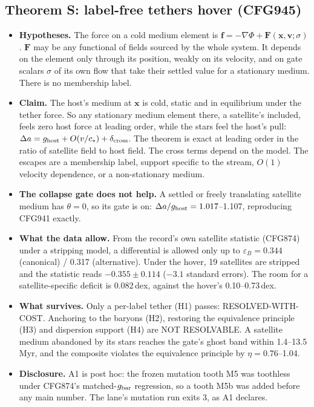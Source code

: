 \documentclass[10pt]{article}
\begin{document}
\subsection{Theorem S: label-free tethers hover (CFG945)}
\begin{itemize}
\item \textbf{Hypotheses.} The force on a cold medium element is $\mathbf f=-\nabla\Phi+\mathbf F(\mathbf x,\mathbf v;\sigma)$. $\mathbf F$ may be any functional of fields sourced by the whole system. It depends on the element only through its position, weakly on its velocity, and on gate scalars $\sigma$ of its own flow that take their settled value for a stationary medium. There is no membership label.
\item \textbf{Claim.} The host's medium at $\mathbf x$ is cold, static and in equilibrium under the tether force. So any stationary medium element there, a satellite's included, feels zero host force at leading order, while the stars feel the host's pull: $\Delta a=g_{\rm host}+O(v/c_*)+\delta_{\rm cross}$. The theorem is exact at leading order in the ratio of satellite field to host field. The cross terms depend on the model. The escapes are a membership label, support specific to the stream, $O(1)$ velocity dependence, or a non-stationary medium.
\item \textbf{The collapse gate does not help.} A settled or freely translating satellite medium has $\theta=0$, so its gate is on: $\Delta a/g_{\rm host}=1.017$--1.107, reproducing CFG941 exactly.
\item \textbf{What the data allow.} From the record's own satellite statistic (CFG874) under a stripping model, a differential is allowed only up to $\varepsilon_B=0.344$ (canonical) / 0.317 (alternative). Under the hover, 19 satellites are stripped and the statistic reads $-0.355\pm0.114$ ($-3.1$ standard errors). The room for a satellite-specific deficit is 0.082\,dex, against the hover's 0.10--0.73\,dex.
\item \textbf{What survives.} Only a per-label tether (H1) passes: RESOLVED-WITH-COST. Anchoring to the baryons (H2), restoring the equivalence principle (H3) and dispersion support (H4) are NOT RESOLVABLE. A satellite medium abandoned by its stars reaches the gate's ghost band within 1.4--13.5\,Myr, and the composite violates the equivalence principle by $\eta=0.76$--1.04.
\item \textbf{Disclosure.} A1 is post hoc: the frozen mutation tooth M5 was toothless under CFG874's matched-$g_{\rm bar}$ regression, so a tooth M5b was added before any main number. The lane's mutation run exits 3, as A1 declares.
\end{itemize}
\end{document}
